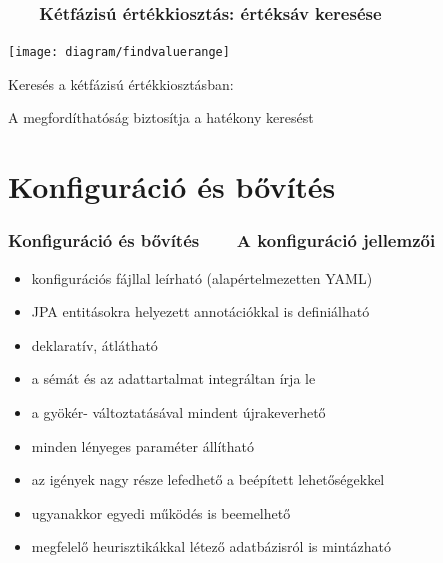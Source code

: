 \documentclass[
]{beamer}
\newcommand{\slidetitle}[2]{\frametitle{{\small #1 ~ \ding{226} ~ } \normalsize \textbf{#2} }}
\begin{document}
\begin{frame}
    \slidetitle{\sectionshorttitle}{Kétfázisú értékkiosztás: értéksáv keresése}
    
    \centering
    
    \texttt{[image: diagram/findvaluerange]}
    
    \vspace{0.5cm}
    
    Keresés a kétfázisú értékkiosztásban: \par
    A megfordíthatóság biztosítja a hatékony keresést
\end{frame}

\section{Konfiguráció és bővítés}
\def\sectionshorttitle{Konfiguráció és bővítés}

\begin{frame}
    \slidetitle{\sectionshorttitle}{A konfiguráció jellemzői}
    
    \begin{itemize}
        \setlength\itemsep{0.5em}
        \pause \item konfigurációs fájllal leírható (alapértelmezetten YAML)
        \pause \item JPA entitásokra helyezett annotációkkal is definiálható
        \pause \item deklaratív, átlátható
        \pause \item a sémát és az adattartalmat integráltan írja le
        \pause \item a gyökér- változtatásával mindent újrakeverhető
        \pause \item minden lényeges paraméter állítható
        \pause \item az igények nagy része lefedhető a beépített lehetőségekkel
        \pause \item ugyanakkor egyedi működés is beemelhető
        \pause \item megfelelő heurisztikákkal létező adatbázisról is mintázható
    \end{itemize}
\end{frame}
\end{document}
